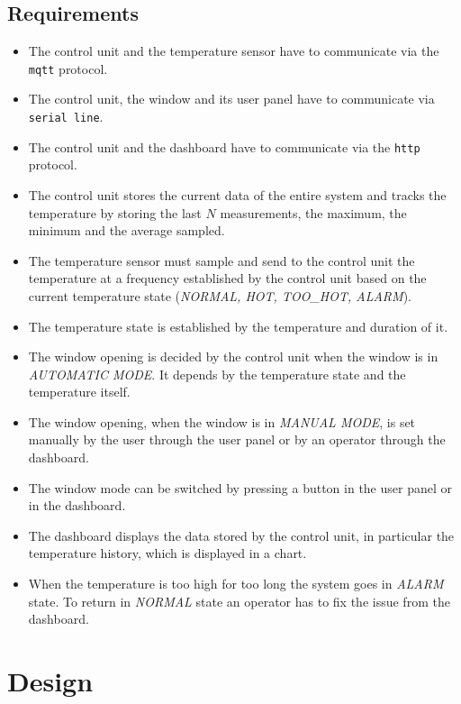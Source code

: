 \documentclass[a4paper,12pt]{report}
\begin{document}
    \section{Requirements}

        \begin{itemize}
            \item The control unit and the temperature sensor have to communicate via the \texttt{mqtt} protocol.
            \item The control unit, the window and its user panel have to communicate via \texttt{serial line}.
            \item The control unit and the dashboard have to communicate via the \texttt{http} protocol.
            \item The control unit stores the current data of the entire system and tracks the temperature by storing the last
            $N$ measurements, the maximum, the minimum and the average sampled.
            \item The temperature sensor must sample and send to the control unit the temperature at a frequency established by
            the control unit based on the current temperature state (\textit{NORMAL, HOT, TOO\_HOT, ALARM}).
            \item The temperature state is established by the temperature and duration of it.
            \item The window opening is decided by the control unit when the window is in \textit{AUTOMATIC MODE}. It depends by
            the temperature state and the temperature itself.
            \item The window opening, when the window is in \textit{MANUAL MODE}, is set manually by the user through the user panel 
            or by an operator through the dashboard.
            \item The window mode can be switched by pressing a button in the user panel or in the dashboard.
            \item The dashboard displays the data stored by the control unit, in particular the temperature history, which is displayed
            in a chart.
            \item When the temperature is too high for too long the system goes in \textit{ALARM} state. To return in
            \textit{NORMAL} state an operator has to fix the issue from the dashboard.
        \end{itemize}


\chapter{Design}
\end{document}
